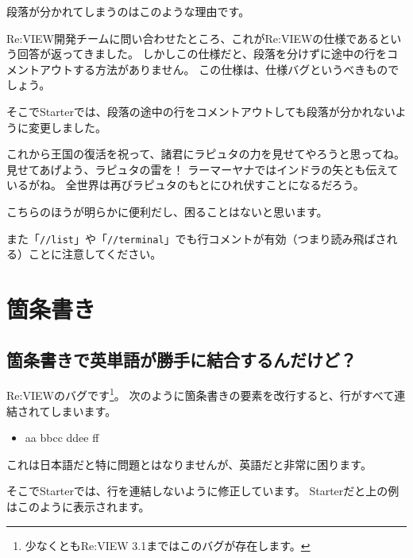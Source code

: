 段落が分かれてしまうのはこのような理由です。

Re:VIEW開発チームに問い合わせたところ、これがRe:VIEWの仕様であるという回答が返ってきました。
しかしこの仕様だと、段落を分けずに途中の行をコメントアウトする方法がありません。
この仕様は、仕様バグというべきものでしょう。

そこでStarterでは、段落の途中の行をコメントアウトしても段落が分かれないように変更しました。

\noindent
{}

\starterresult

これから王国の復活を祝って、諸君にラピュタの力を見せてやろうと思ってね。
見せてあげよう、ラピュタの雷を！
ラーマーヤナではインドラの矢とも伝えているがね。
全世界は再びラピュタのもとにひれ伏すことになるだろう。

\endstarterresult

こちらのほうが明らかに便利だし、困ることはないと思います。

また「\texttt{//list}」や「\texttt{//terminal}」でも行コメントが有効（つまり読み飛ばされる）ことに注意してください。

\section{箇条書き}
\label{sec:2-2}

\subsection{箇条書きで英単語が勝手に結合するんだけど？}
\label{sec:2-2-1}

Re:VIEWのバグです\footnote{少なくともRe:VIEW 3.1まではこのバグが存在します。}。
次のように箇条書きの要素を改行すると、行がすべて連結されてしまいます。

\begin{starterprogram}\end{starterprogram}
\noindent
{}

\starterresult

\begin{itemize}
\item aa bbcc ddee ff
\end{itemize}

\endstarterresult

これは日本語だと特に問題とはなりませんが、英語だと非常に困ります。

そこでStarterでは、行を連結しないように修正しています。
Starterだと上の例はこのように表示されます。

